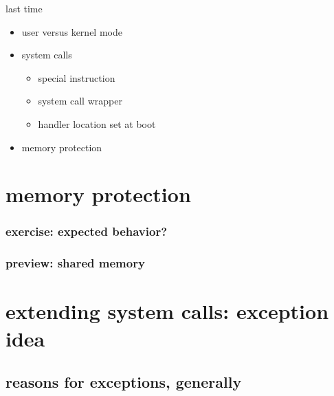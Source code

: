 \date{}
\title{}
\date{}

\begin{frame}
    \titlepage
\end{frame}



\begin{frame}{last time}
    \begin{itemize}
    \item user versus kernel mode
    \item system calls
        \begin{itemize}
        \item special instruction
        \item system call wrapper
        \item handler location set at boot
        \end{itemize}
    \item memory protection
    \end{itemize}
\end{frame}



\section{memory protection}
\subsubsection{exercise: expected behavior?}


\subsubsection{preview: shared memory}


\section{extending system calls: exception idea}


\subsection{reasons for exceptions, generally}


